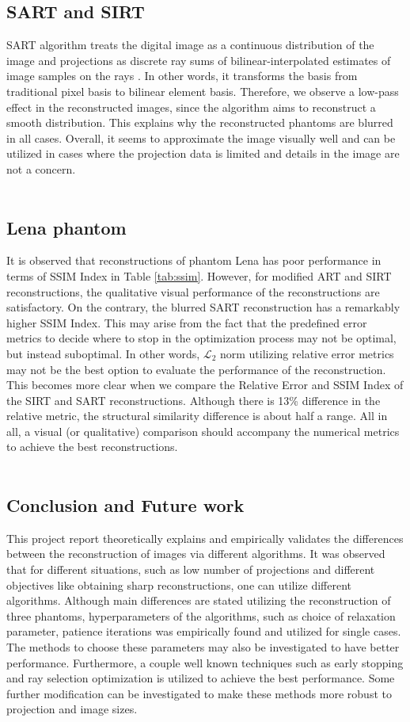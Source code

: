 \documentclass[journal]{IEEEtran}
\begin{document}
\subsection{SART and SIRT}
SART algorithm treats the digital image as a continuous distribution of the image and projections as discrete ray sums of bilinear-interpolated estimates of image samples on the rays \cite*{andersen1984sart}. In other words, it transforms the basis from traditional pixel basis to bilinear element basis. Therefore, we observe a low-pass effect in the reconstructed images, since the algorithm aims to reconstruct a smooth distribution. This explains why the reconstructed phantoms are blurred in all cases. Overall, it seems to approximate the image visually well and can be utilized in cases where the projection data is limited and details in the image are not a concern.
\\
\\
\subsection{Lena phantom}
It is observed that reconstructions of phantom Lena has poor performance in terms of SSIM Index in Table \ref*{tab:ssim}. However, for modified ART and SIRT reconstructions, the qualitative visual performance of the reconstructions are satisfactory. On the contrary, the blurred SART reconstruction has a remarkably higher SSIM Index. This may arise from the fact that the predefined error metrics to decide where to stop in the optimization process may not be optimal, but instead suboptimal. In other words, $\mathcal{L_2}$ norm utilizing relative error metrics may not be the best option to evaluate the performance of the reconstruction. This becomes more clear when we compare the Relative Error and SSIM Index of the SIRT and SART reconstructions. Although there is 13\% difference in the relative metric, the structural similarity difference is about half a range. All in all, a visual (or qualitative) comparison should accompany the numerical metrics to achieve the best reconstructions. 
\\
\\
\subsection{Conclusion and Future work}
This project report theoretically explains and empirically validates the differences between the reconstruction of images via different algorithms. It was observed that for different situations, such as low number of projections and different objectives like obtaining sharp reconstructions, one can utilize different algorithms. Although main differences are stated utilizing the reconstruction of three phantoms, hyperparameters of the algorithms, such as choice of relaxation parameter, patience iterations was empirically found and utilized for single cases. The methods to choose these parameters may also be investigated to have better performance. Furthermore, a couple well known techniques such as early stopping and ray selection optimization is utilized to achieve the best performance. Some further modification can be investigated to make these methods more robust to projection and image sizes. 
\newpage
\printbibliography
\end{document}
